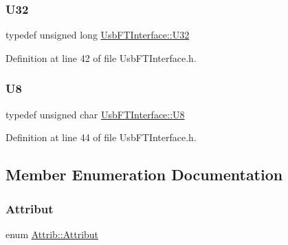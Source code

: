 \subsubsection{\texorpdfstring{U32}{U32}}
{\footnotesize\ttfamily typedef unsigned long \hyperlink{classUsbFTInterface_aee2201fe4d977aa03568fa8dbacc39ba}{Usb\+F\+T\+Interface\+::\+U32}}



Definition at line 42 of file Usb\+F\+T\+Interface.\+h.

\mbox{\label{classUsbFTInterface_a3b007566f8af758984d97ada2b9938d3}} 
\subsubsection{\texorpdfstring{U8}{U8}}
{\footnotesize\ttfamily typedef unsigned char \hyperlink{classUsbFTInterface_a3b007566f8af758984d97ada2b9938d3}{Usb\+F\+T\+Interface\+::\+U8}}



Definition at line 44 of file Usb\+F\+T\+Interface.\+h.



\subsection{Member Enumeration Documentation}
\mbox{\label{classAttrib_a69e171d7cc6417835a5a306d3c764235}} 
\subsubsection{\texorpdfstring{Attribut}{Attribut}}
{\footnotesize\ttfamily enum \hyperlink{classAttrib_a69e171d7cc6417835a5a306d3c764235}{Attrib\+::\+Attribut}\hspace{0.3cm}{\ttfamily [inherited]}}

